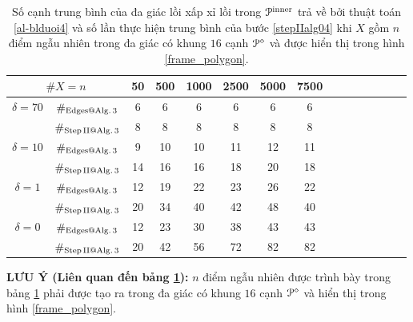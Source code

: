 \documentclass[12pt,a4paper,openany,oneside]{report}
\begin{document}
\begin{table}[ht]
	\begin{center}\renewcommand{\arraystretch}{1.2}\small
		\setlength\tabcolsep{0.3cm}
		\begin{tabular}{|c|c||c|c|c|c|c|c|c|c|c|c|c|c|c|}
			\hline
			\multicolumn {2}{|c||}{\footnotesize $\#X=n$}  &50& 500& 1000& 2500& 5000& 7500\\ 
			\hline		
			\hline
			{ $\delta = 70$}
			
			& $\#_{\rm Edges@ Alg.\, 3}$  &6 & 6 & 6 & 6 & 6 & 6\\
			
			& $\#_{\rm Step\, II @ Alg.\, 3}$&8 & 8 & 8 & 8 & 8 & 8  \\
			\hline
			{ $\delta = 10$}
			
			& $\#_{\rm Edges@ Alg.\, 3}$  &9 & 10 & 10 & 11 & 12 & 11 \\
			
			& $\#_{\rm Step\, II @ Alg.\, 3}$&14 & 16 & 16 & 18 & 20 & 18\\
			\hline
			{ $\delta = 1$}
			
			& $\#_{\rm Edges@ Alg.\,3}$  &12 & 19 & 22 & 23 & 26 & 22 \\
			
			& $\#_{\rm Step\, II @ Alg.\, 3}$&20 & 34 & 40 & 42 & 48 & 40  \\
			\hline
			{ $\delta = 0$}
			
			& $\#_{\rm Edges@ Alg.\, 3}$  &12 & 23 & 30 & 38 & 43 & 43 \\
			
			& $\#_{\rm Step\, II @ Alg.\, 3}$&20 & 42 & 56 & 72 & 82 & 82  \\
			\hline
		\end{tabular}
		\caption{Số cạnh trung bình của đa giác lồi xấp xỉ lồi trong ${\cal P}^{\rm inner}$ trả về bởi thuật toán \ref{al-blduoi4} và số lần thực hiện trung bình của bước \ref{stepIIalg04} khi $X$ gồm $n$ điểm ngẫu nhiên trong đa giác có khung $16$ cạnh ${\cal P}^\diamond$ và được hiển thị trong hình \ref{frame_polygon}.}
		\label{table03}
	\end{center}
\end{table} 	

	\bigskip\noindent
	{\bf LƯU Ý (Liên quan đến bảng \ref{table03}):}  $n$ điểm ngẫu nhiên được trình bày trong bảng \ref{table03} phải được tạo ra trong đa giác có khung $16$ cạnh ${\cal P}^\diamond$ và hiển thị trong hình \ref{frame_polygon}.
	
	\bigskip
\end{document}
